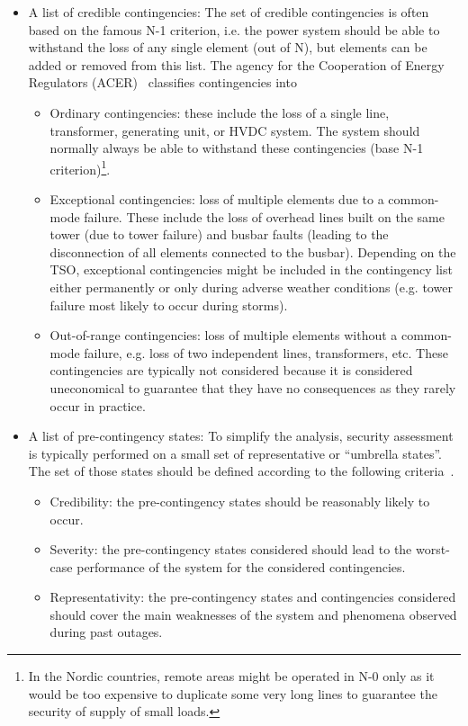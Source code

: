 \begin{itemize}
    \item A list of credible contingencies: The set of credible contingencies is often based on the famous N-1 criterion, i.e. the power system should be able to withstand the loss of any single element (out of N), but elements can be added or removed from this list. The agency for the Cooperation of Energy Regulators (ACER)~\cite{ACER_CSAM} classifies contingencies into
    \begin{itemize}
        \item Ordinary contingencies: these include the loss of a single line, transformer, generating unit, or HVDC system. The system should normally always be able to withstand these contingencies (base N-1 criterion)\footnote{In the Nordic countries, remote areas might be operated in N-0 only as it would be too expensive to duplicate some very long lines to guarantee the security of supply of small loads.}.
        \item Exceptional contingencies: loss of multiple elements due to a common-mode failure. These include the loss of overhead lines built on the same tower (due to tower failure) and busbar faults (leading to the disconnection of all elements connected to the busbar). Depending on the TSO, exceptional contingencies might be included in the contingency list either permanently or only during adverse weather conditions (e.g. tower failure most likely to occur during storms).
        \item Out-of-range contingencies: loss of multiple elements without a common-mode failure, e.g. loss of two independent lines, transformers, etc. These contingencies are typically not considered because it is considered uneconomical to guarantee that they have no consequences as they rarely occur in practice.
    \end{itemize}
    \item A list of pre-contingency states: To simplify the analysis, security assessment is typically performed on a small set of representative or ``umbrella states''. The set of those states should be defined according to the following criteria~\cite{CIGREreviewOfTools}.
    \begin{itemize}
        \item Credibility: the pre-contingency states should be reasonably likely to occur.
        \item Severity: the pre-contingency states considered should lead to the worst-case performance of the system for the considered contingencies.
        \item Representativity: the pre-contingency states and contingencies considered should cover the main weaknesses of the system and phenomena observed during past outages.

\end{itemize}
\end{itemize}
